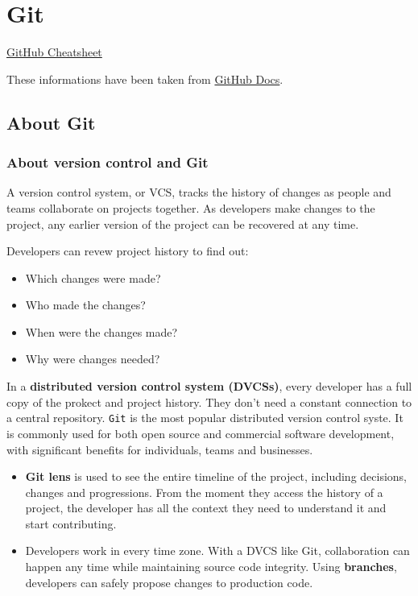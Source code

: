 
\chapter{Git}

\href{https://training.github.com/downloads/github-git-cheat-sheet.pdf}{GitHub Cheatsheet}

These informations have been taken from \href{https://docs.github.com/en/get-started/using-git}{GitHub Docs}.

\section{About Git}

\subsection{About version control and Git}

\begin{definitionblock}
    A version control system, or VCS, tracks the history of changes as people and teams collaborate on projects together. As developers make changes to the project, any earlier version of the project can be recovered at any time.
\end{definitionblock}

Developers can revew project history to find out:
\begin{itemize}
    \item Which changes were made?
    \item Who made the changes?
    \item When were the changes made?
    \item Why were changes needed?
\end{itemize}

In a \textbf{distributed version control system (DVCSs)}, every developer has a full copy of the prokect and project history. They don't need a constant connection to a central repository. \texttt{Git} is the most popular distributed version control syste. It is commonly used for both open source and commercial software development, with significant benefits for individuals, teams and businesses. 

\begin{tipsblock}
    \begin{itemize}
        \item \textbf{Git lens} is used to see the entire timeline of the project, including decisions, changes and progressions. From the moment they access the history of a project, the developer has all the context they need to understand it and start contributing.
        \item Developers work in every time zone. With a DVCS like Git, collaboration can happen any time while maintaining source code integrity. Using \textbf{branches}, developers can safely propose changes to production code.
    \end{itemize}
\end{tipsblock}

